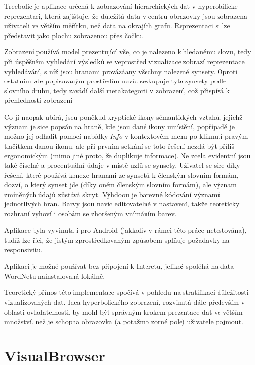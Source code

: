 \documentclass[a4paper, 11pt, oneside]{book}
\begin{document}
				Treebolic je aplikace určená k zobrazování hierarchických dat v hyperobilicke reprezentaci, která zajišťuje, že důležitá data v centru obrazovky jsou zobrazena uživateli ve větším měřítku, než data na okrajích grafu. Reprezentaci si lze představit jako plochu zobrazenou přes čočku. 

				Zobrazení používá model prezentující vše, co je nalezeno k hledanému slovu, tedy při úspěšném vyhledání výsledků se veprostřed vizualizace zobrazí reprezentace vyhledávání, s níž jsou hranami provázáany všechny nalezené synsety. Oproti ostatním zde popisovaným prostředím navíc seskupuje tyto synsety podle slovního druhu, tedy zavádí další metakategorii v zobrazení, což přispívá k přehlednosti zobrazení. 

				Co jí naopak ubírá, jsou poněkud kryptické ikony sémantických vztahů, jejichž význam je sice popsán na hraně, kde jsou dané ikony umístění, popřípadě je možno jej odhalit pomocí nabídky \textit{Info} v kontextovém menu po kliknutí pravým tlačítkem danou ikonu, ale při prvním setkání se toto řešení nezdá být příliš ergonomickým (mimo jiné proto, že duplikuje informace). Ne zcela evidentní jsou také číselné a procentuální údaje v místě uzlů se synsety. Uživatel se sice díky řešení, které používá konexe hranami ze synsetů k členským slovním formám, dozví, o který synset jde (díky oněm členským slovním formám), ale význam zmíněných údajů zůstává skryt. Výhdoou je barevné kódování významů jednotlivých hran. Barvy jsou navíc editovatelné v nastavení, takže teoreticky rozhraní vyhoví i osobám se zhoršeným vnímáním barev.

				Aplikace byla vyvinuta i pro Android (jakkoliv v rámci této práce netestována), tudíž lze říci, že jistým zprostředkovaným způsobem splňuje požadavky na responsivitu.

				Aplikaci je možné používat bez připojení k Interetu, jelikož spoléhá na data WordNetu nainstalovaná lokálně.

				Teoretický přínos této implementace spočívá v pohledu na stratifikaci důležitosti vizualizovaných dat. Idea hyperbolického zobrazení, rozvinutá dále především v oblasti ovladatelnosti, by mohl být správným krokem prezentace dat ve větším množství, než je schopna obrazovka (a potažmo zorné pole) uživatele pojmout.

			\section{VisualBrowser}
\end{document}
